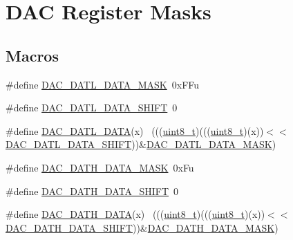 \hypertarget{group___d_a_c___register___masks}{}\section{D\+AC Register Masks}
\label{group___d_a_c___register___masks}
\subsection*{Macros}
\begin{DoxyCompactItemize}
\item 
\#define \hyperlink{group___d_a_c___register___masks_ga1874318b69ed4b2d190e887ed43e39bf}{D\+A\+C\+\_\+\+D\+A\+T\+L\+\_\+\+D\+A\+T\+A\+\_\+\+M\+A\+SK}~0x\+F\+Fu
\item 
\#define \hyperlink{group___d_a_c___register___masks_ga3c93e96482e5e842d2232a78bcdefa17}{D\+A\+C\+\_\+\+D\+A\+T\+L\+\_\+\+D\+A\+T\+A\+\_\+\+S\+H\+I\+FT}~0
\item 
\#define \hyperlink{group___d_a_c___register___masks_ga2923650bda04d892a226840bdadaeec7}{D\+A\+C\+\_\+\+D\+A\+T\+L\+\_\+\+D\+A\+TA}(x)                                              ~(((\hyperlink{_p_e___types_8h_aba7bc1797add20fe3efdf37ced1182c5}{uint8\+\_\+t})(((\hyperlink{_p_e___types_8h_aba7bc1797add20fe3efdf37ced1182c5}{uint8\+\_\+t})(x))$<$$<$\hyperlink{group___d_a_c___register___masks_ga3c93e96482e5e842d2232a78bcdefa17}{D\+A\+C\+\_\+\+D\+A\+T\+L\+\_\+\+D\+A\+T\+A\+\_\+\+S\+H\+I\+FT}))\&\hyperlink{group___d_a_c___register___masks_ga1874318b69ed4b2d190e887ed43e39bf}{D\+A\+C\+\_\+\+D\+A\+T\+L\+\_\+\+D\+A\+T\+A\+\_\+\+M\+A\+SK})
\item 
\#define \hyperlink{group___d_a_c___register___masks_ga2d3ae44d77c6c039e134b60f5d0b8c70}{D\+A\+C\+\_\+\+D\+A\+T\+H\+\_\+\+D\+A\+T\+A\+\_\+\+M\+A\+SK}~0x\+Fu
\item 
\#define \hyperlink{group___d_a_c___register___masks_ga108839fa938503d4fe96793470af0565}{D\+A\+C\+\_\+\+D\+A\+T\+H\+\_\+\+D\+A\+T\+A\+\_\+\+S\+H\+I\+FT}~0
\item 
\#define \hyperlink{group___d_a_c___register___masks_ga309894cfd52375341853b92ef9ce427c}{D\+A\+C\+\_\+\+D\+A\+T\+H\+\_\+\+D\+A\+TA}(x)                                              ~(((\hyperlink{_p_e___types_8h_aba7bc1797add20fe3efdf37ced1182c5}{uint8\+\_\+t})(((\hyperlink{_p_e___types_8h_aba7bc1797add20fe3efdf37ced1182c5}{uint8\+\_\+t})(x))$<$$<$\hyperlink{group___d_a_c___register___masks_ga108839fa938503d4fe96793470af0565}{D\+A\+C\+\_\+\+D\+A\+T\+H\+\_\+\+D\+A\+T\+A\+\_\+\+S\+H\+I\+FT}))\&\hyperlink{group___d_a_c___register___masks_ga2d3ae44d77c6c039e134b60f5d0b8c70}{D\+A\+C\+\_\+\+D\+A\+T\+H\+\_\+\+D\+A\+T\+A\+\_\+\+M\+A\+SK})

\end{DoxyCompactItemize}
